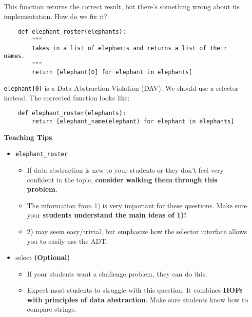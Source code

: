     
    \begin{blocksection}
    \question This function returns the correct result, but there's something wrong
    about its implementation. How do we fix it?
    
    \begin{lstlisting}
    def elephant_roster(elephants):
        """
        Takes in a list of elephants and returns a list of their names.
        """
        return [elephant[0] for elephant in elephants]
    \end{lstlisting}
    \begin{solution}[1in]
    \lstinline{elephant[0]} is a Data Abstraction Violation (DAV).
    We should use a selector instead.
    The corrected function looks like:
    \begin{lstlisting}
    def elephant_roster(elephants):
        return [elephant_name(elephant) for elephant in elephants]
    \end{lstlisting}
    \end{solution}
    
    \end{blocksection}
    
    
    \begin{guide}
    \textbf{Teaching Tips}
    \begin{itemize}
        \item \texttt{elephant\_roster}
        \begin{itemize}
            \item If data abstraction is new to your students or they don’t feel very confident in the topic, \textbf{consider walking them through this problem}.
            \item The information from 1) is very important for these questions. Make sure your \textbf{students understand the main ideas of 1)!}
            \item 2) may seem easy/trivial, but emphasize how the selector interface allows you to easily use the ADT.
        \end{itemize}
        \item select \textbf{(Optional)}
        \begin{itemize}
            \item If your students want a challenge problem, they can do this.
            \item Expect most students to struggle with this question. It combines \textbf{HOFs with principles of data abstraction}. Make sure students know how to compare strings.
        \end{itemize}
    \end{itemize}
    \end{guide}
    
    